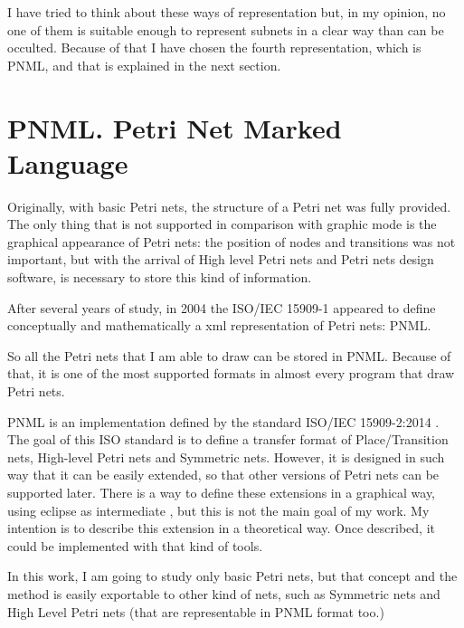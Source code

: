 I have tried to think about these ways of representation but, in my opinion, no one of them is suitable enough to represent subnets in a clear way than can be occulted. Because of that I have chosen the fourth representation, which is PNML, and that is explained in the next section. 

\section{PNML. Petri Net Marked Language}

Originally, with basic Petri nets, the structure of a Petri net was fully provided.
The only thing that is not supported in comparison with graphic mode is the graphical appearance of Petri nets: the position of nodes and
transitions was not
important, but with the arrival of High level Petri nets and Petri nets design
software, is necessary to store this kind of information.

After several years of study, in 2004 the ISO/IEC 15909-1  \cite{PNML-iso/iec-15909-1} appeared to define conceptually and mathematically a xml representation
of Petri nets: PNML\cite{PNML-Hillah2006307}.  


So all the Petri nets that I am able to draw can be stored in PNML. Because
of that, it is one of the most supported formats in almost every program that
draw Petri nets. 

PNML \cite{PNML-pnml.org} is an implementation defined by the standard ISO/IEC 15909-2:2014 \cite{PNML-iso/iec-15909-2:2011}. The goal of this ISO standard is to define a transfer format of Place/Transition nets, High-level Petri nets and Symmetric nets. However, it is designed in
such way that it can be easily extended, so that other versions of Petri
nets can be supported later.
There is a way to define these extensions in a graphical way, using eclipse
as intermediate \cite{PNMLE-Kindler2011318,PNMLE-Hillah201246}, but this
is not the main goal of my work. My intention is to describe this extension
in a theoretical way. Once described, it could be implemented with that kind
of tools.

In this work, I am going to study only basic Petri nets, but
that concept and the method is easily exportable to other kind of nets, such as Symmetric nets and High Level Petri nets (that are representable in PNML
format too.)

